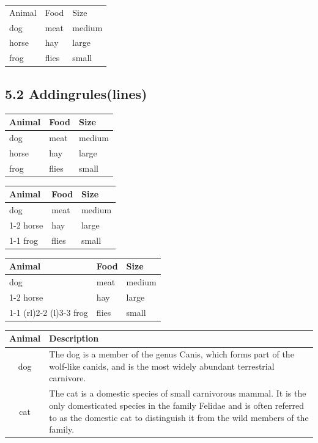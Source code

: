 \documentclass{article}
\begin{document}
 \begin{tabular}{*{3}{l}}
 Animal & Food & Size \\
 dog & meat & medium \\
 horse & hay & large \\
 frog & flies & small \\
 \end{tabular}

\subsection*{ 5.2 Addingrules(lines)}

 \begin{tabular}{lll}
 \toprule
 Animal & Food & Size \\
 \midrule
 dog & meat & medium \\
 horse & hay & large \\
 frog & flies & small \\
 \bottomrule
 \end{tabular}

\vspace{2em}

 \begin{tabular}{lll}
 \toprule
 Animal & Food & Size \\
 \midrule
 dog & meat & medium \\
 \cmidrule{1-2}
 horse & hay & large \\
 \cmidrule{1-1}
 \cmidrule{3-3}
 frog & flies & small \\
 \bottomrule
 \end{tabular}

\vspace{2em}

 \begin{tabular}{lll}
 \toprule
 Animal & Food & Size \\
 \midrule
 dog & meat & medium \\
 \cmidrule{1-2}
 horse & hay & large \\
 \cmidrule(r){1-1}
 \cmidrule(rl){2-2}
 \cmidrule(l){3-3}
 frog & flies & small \\
 \bottomrule
 \end{tabular}

\vspace{2em}

 \begin{tabular}{cp{9cm}}
 \toprule
 Animal & Description \\
 \midrule
 dog  & The dog is a member of the genus Canis, which forms part of the  wolf-like canids, and is the most widely abundant
 terrestrial carnivore. \\
  \addlinespace
 cat & The cat is a domestic species of small carnivorous mammal. It is the  only domesticated species in the family Felidae and is often referred  to as the domestic cat to distinguish it from the wild members of the family. \\
\bottomrule
 \end{tabular}
\end{document}
